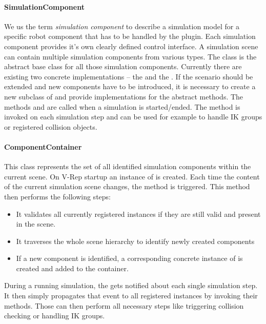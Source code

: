 \paragraph{SimulationComponent}

We us the term \emph{simulation component} to describe a simulation model for a specific robot component that has to be handled by the plugin. Each simulation component provides it's own clearly defined control interface. A simulation scene can contain multiple simulation components from various types. The  class is the abstract base class for all those simulation components. Currently there are existing two concrete implementations -- the  and the . If the scenario should be extended and new components have to be introduced, it is necessary to create a new subclass of  and provide implementations for the abstract methods. The methods  and  are called when a simulation is started/ended. The method  is invoked on each simulation step and can be used for example to handle IK groups or registered collision objects.

\paragraph{ComponentContainer}

This class represents the set of all identified simulation components within the current scene. On V-Rep startup an instance of  is created. Each time the content of the current simulation scene changes, the method  is triggered. This method then performs the following steps:
\begin{itemize}

\item
It validates all currently registered  instances if they are still valid and present in the scene.
\item
It traverses the whole scene hierarchy to identify newly created components
\item
If a new component is identified, a corresponding concrete instance of  is created and added to the container.

\end{itemize}
  
During a running simulation, the  gets notified about each single simulation step. It then simply propagates that event to all registered  instances by invoking their  methods. Those can then perform all necessary steps like triggering collision checking or handling IK groups.

